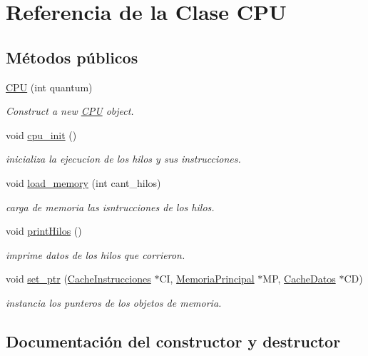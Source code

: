 \hypertarget{classCPU}{}\section{Referencia de la Clase C\+PU}
\label{classCPU}
\subsection*{Métodos públicos}
\begin{DoxyCompactItemize}
\item 
\hyperlink{classCPU_a1901d19879a542ce4021fea5355ef056}{C\+PU} (int quantum)
\begin{DoxyCompactList}\small\item\em Construct a new \hyperlink{classCPU}{C\+PU} object. \end{DoxyCompactList}\item 
void \hyperlink{classCPU_a06f4d0b7369cb2520e7795a77d18887d}{cpu\+\_\+init} ()
\begin{DoxyCompactList}\small\item\em inicializa la ejecucion de los hilos y sus instrucciones. \end{DoxyCompactList}\item 
void \hyperlink{classCPU_acbee1b754fbf381f3fa08cf3f3c1a489}{load\+\_\+memory} (int cant\+\_\+hilos)
\begin{DoxyCompactList}\small\item\em carga de memoria las isntrucciones de los hilos. \end{DoxyCompactList}\item 
void \hyperlink{classCPU_a5f109b7be44b7f800938c3de9ebbc2a4}{print\+Hilos} ()
\begin{DoxyCompactList}\small\item\em imprime datos de los hilos que corrieron. \end{DoxyCompactList}\item 
void \hyperlink{classCPU_ac1b30c01a5d6d8cc5410b397747375f7}{set\+\_\+ptr} (\hyperlink{classCacheInstrucciones}{Cache\+Instrucciones} $\ast$CI, \hyperlink{classMemoriaPrincipal}{Memoria\+Principal} $\ast$MP, \hyperlink{classCacheDatos}{Cache\+Datos} $\ast$CD)
\begin{DoxyCompactList}\small\item\em instancia los punteros de los objetos de memoria. \end{DoxyCompactList}\end{DoxyCompactItemize}


\subsection{Documentación del constructor y destructor}
\mbox{\label{classCPU_a1901d19879a542ce4021fea5355ef056}} 
